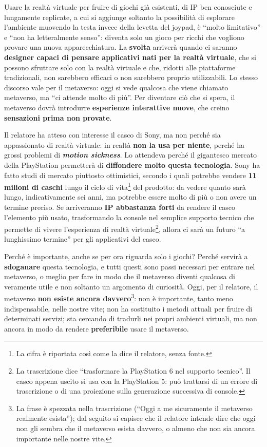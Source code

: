 Usare la realtà virtuale per fruire di giochi già esistenti, di IP ben
conosciute e lungamente replicate, a cui si aggiunge soltanto la possibilità di
esplorare l'ambiente muovendo la testa invece della levetta del joypad, è
``molto limitativo'' e ``non ha letteralmente senso'': diventa solo un gioco
per ricchi che vogliono provare una nuova apparecchiatura. La \textbf{svolta}
arriverà quando ci saranno \textbf{designer capaci di pensare applicativi nati
per la realtà virtuale}, che si possono sfruttare solo con la realtà virtuale e
che, ridotti alle piattaforme tradizionali, non sarebbero efficaci o non
sarebbero proprio utilizzabili. Lo stesso discorso vale per il metaverso: oggi
si vede qualcosa che viene chiamato metaverso, ma ``ci attende molto di più''.
Per diventare ciò che si spera, il metaverso dovrà introdurre \textbf{esperienze
interattive nuove}, che creino \textbf{sensazioni prima non provate}.

Il relatore ha atteso con interesse il casco di Sony, ma non perché sia
appassionato di realtà virtuale: in realtà \textbf{non la usa per niente},
perché ha grossi problemi di \textbf{\emph{motion sickness}}. Lo attendeva perché
il gigantesco mercato della PlayStation permetterà di \textbf{diffondere molto
questa tecnologia}. Sony ha fatto studi di mercato piuttosto ottimistici,
secondo i quali potrebbe vendere \textbf{11 milioni di caschi} lungo il ciclo di
vita\footnote{La cifra è riportata così come la dice il relatore, senza fonte.}
del prodotto: da vedere quanto sarà lungo, indicativamente sei anni, ma
potrebbe essere molto di più o non avere un termine preciso. Se arriveranno
\textbf{IP abbastanza forti} da rendere il casco l'elemento più usato,
trasformando la console nel semplice supporto tecnico che permette di vivere
l'esperienza di realtà virtuale\footnote{La trascrizione dice ``trasformare la
PlayStation 6 nel supporto tecnico''. Il casco appena uscito si usa con la
PlayStation 5: può trattarsi di un errore di trascrizione o di una proiezione
sulla generazione successiva di console.}, allora ci sarà un futuro ``a
lunghissimo termine'' per gli applicativi del casco.

Perché è importante, anche se per ora riguarda solo i giochi? Perché servirà a
\textbf{sdoganare} questa tecnologia, e tutti questi sono passi necessari per
entrare nel metaverso, o meglio per fare in modo che il metaverso diventi
qualcosa di veramente utile e non soltanto un argomento di curiosità. Oggi, per
il relatore, il metaverso \textbf{non esiste ancora davvero}\footnote{La frase è
spezzata nella trascrizione (``Oggi a me sicuramente il metaverso realmente
esista''); dal seguito si capisce che il relatore intende dire che oggi non gli
sembra che il metaverso esista davvero, o almeno che non sia ancora importante
nelle nostre vite.}: non è importante, tanto meno indispensabile, nelle nostre
vite; non ha sostituito i metodi attuali per fruire di determinati servizi; sta
cercando di tradurli nei propri ambienti virtuali, ma non ancora in modo da
rendere \textbf{preferibile} usare il metaverso.

